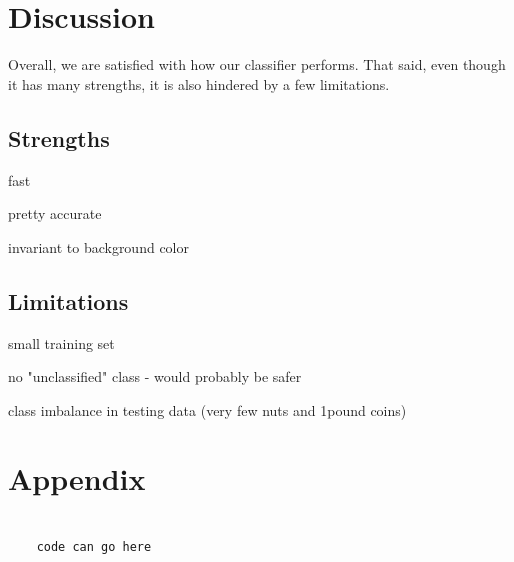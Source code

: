 \documentclass[12pt]{article}
\begin{document}
\section{Discussion}

Overall, we are satisfied with how our classifier performs. That said, even though it has many strengths, it is also hindered by a few limitations.

\subsection{Strengths}

fast

pretty accurate

invariant to background color

\subsection{Limitations}

small training set

no "unclassified" class - would probably be safer

class imbalance in testing data (very few nuts and 1pound coins)

\section*{Appendix}

\begin{verbatim}
	
	code can go here
	
\end{verbatim}
\end{document}
